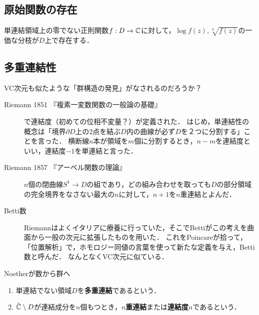 \documentclass[uplatex, dvipdfmx]{jsreport}
\begin{document}
\subsection{原始関数の存在}

\begin{corollary}
    単連結領域上の零でない正則関数$f:D\to\mathbb{C}$に対して，$\log f(z),\sqrt[n]{f(z)}$の一価な分枝が$D$上で存在する．
\end{corollary}

\subsection{多重連結性}

\begin{history}
    VC次元も似たような「群構造の発見」がなされるのだろうか？
    \begin{description}
        \item[Riemann 1851 『複素一変数関数の一般論の基礎』] で連結度（初めての位相不変量？）が定義された．
        はじめ，単連結性の概念は「境界$\partial D$上の2点を結ぶ$D$内の曲線が必ず$D$を２つに分割する」ことを言った．
        横断線$n$本が領域を$m$個に分割するとき，$n-m$を連結度といい，連結度$-1$を単連結と言った．
        \item[Riemann 1857 『アーベル関数の理論』]
        $n$個の閉曲線$S^1\to D$の組であり，どの組み合わせを取っても$D$の部分領域の完全境界をなさない最大の$n$に対して，$n+1$を$n$重連結とよんだ．
        \item[Betti数]
        Riemannはよくイタリアに療養に行っていた，そこでBettiがこの考えを曲面から一般の次元に拡張したものを用いた．
        これをPoincareが拾って，「位置解析」で，ホモロジー同値の言葉を使って新たな定義を与え，Betti数と呼んだ．
        なんとなくVC次元に似ている．
        \item[Noetherが数から群へ] 
    \end{description}
\end{history}

\begin{definition}\mbox{}
    \begin{enumerate}
        \item 単連結でない領域$D$を\textbf{多重連結}であるという．
        \item $\hat{\mathbb{C}}\setminus D$が連結成分を$n$個もつとき，\textbf{$n$重連結}または\textbf{連結度$n$}であるという．
    \end{enumerate}
\end{definition}
\end{document}
